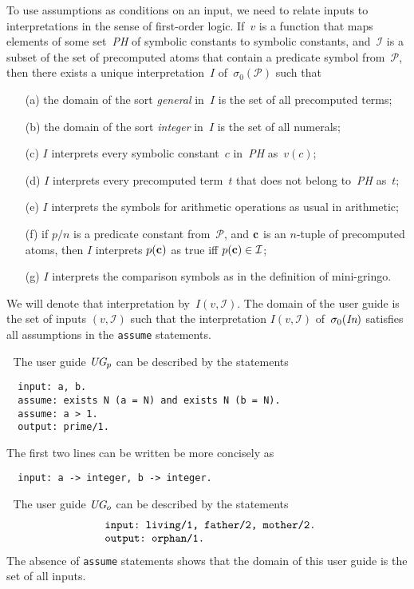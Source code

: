 \documentclass{new_tlp}
\def\beq{\begin{equation}}
\def\eeq#1{\label{#1}\end{equation}}
\def\ba{\begin{array}}
\def\ea{\end{array}}
\def\gringo{{\sc gringo}}
\newcommand{\I}{\mathcal{I}}
\newcommand{\PP}{\mathcal{P}}
\begin{document}
To use assumptions as conditions on an input, we need to relate inputs
to interpretations in the sense of first-order logic.
If~$v$ is a function that maps elements of some set~\emph{PH} of
symbolic constants to symbolic constants, and~$\I$ is a subset of the set of
precomputed atoms that contain a predicate symbol from~$\PP$,
then there exists a unique interpretation~$I$ of~$\sigma_0(\PP)$ such that
\begin{itemize}
\item[(a)]
the domain of the sort \emph{general} in~$I$
  is the set of all precomputed terms;
\item[(b)]
the domain of the sort \emph{integer} in~$I$ is the set of all numerals;
\item[(c)] $I$ interprets every symbolic constant~$c$ in~\emph{PH}
  as~$v(c)$;
\item[(d)] $I$ interprets every precomputed term~$t$ that does not
  belong to~\emph{PH} as~$t$;
\item[(e)] $I$ interprets the symbols for arithmetic operations
  as usual in arithmetic;
\item[(f)] if $p/n$ is a predicate constant from~$\PP$, and $\bf c$
  is an $n$-tuple of precomputed atoms, then $I$ interprets
  $p({\bf c})$ as true iff $p({\bf c})\in\I$;
\item[(g)] $I$ interprets the comparison symbols as in the definition of
  mini-\gringo.
\end{itemize}
We will denote that interpretation by~$I(v,\I)$.
The domain of the user guide is the set of inputs $(v,\I)$ such that
the interpretation $I(v,\I)$ of~$\sigma_0(\emph{In})$ satisfies all
assumptions in the \verb|assume| statements.

\medskip{}$\;$ The user guide $\emph{UG}_p$
can be described by the statements
\begin{verbatim}
  input: a, b.
  assume: exists N (a = N) and exists N (b = N).
  assume: a > 1.
  output: prime/1.
\end{verbatim}
The first two lines can be written be more concisely as
\begin{verbatim}
  input: a -> integer, b -> integer.
\end{verbatim}

\medskip{}$\;$ The user guide $\emph{UG}_o$
can be described by the statements
\beq\ba l
\verb| input: living/1, father/2, mother/2.|\\
\verb| output: orphan/1.|
\ea\eeq{ugo}
The absence of \verb|assume| statements shows that the domain of this
user guide is the set of all inputs.
\end{document}
